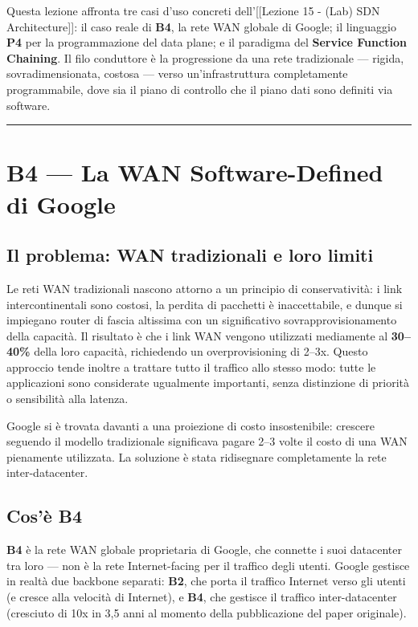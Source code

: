 \documentclass[
  italian,
  openany]{book}
\begin{document}
Questa lezione affronta tre casi d'uso concreti dell'{[}{[}Lezione 15 -
(Lab) SDN Architecture{]}{]}: il caso reale di \textbf{B4}, la rete WAN
globale di Google; il linguaggio \textbf{P4} per la programmazione del
data plane; e il paradigma del \textbf{Service Function Chaining}. Il
filo conduttore è la progressione da una rete tradizionale --- rigida,
sovradimensionata, costosa --- verso un'infrastruttura completamente
programmabile, dove sia il piano di controllo che il piano dati sono
definiti via software.

\begin{center}\rule{0.5\linewidth}{0.5pt}\end{center}

\section{B4 --- La WAN Software-Defined di
Google}\label{b4-la-wan-software-defined-di-google}

\subsection{Il problema: WAN tradizionali e loro
limiti}\label{il-problema-wan-tradizionali-e-loro-limiti}

Le reti WAN tradizionali nascono attorno a un principio di
conservatività: i link intercontinentali sono costosi, la perdita di
pacchetti è inaccettabile, e dunque si impiegano router di fascia
altissima con un significativo sovrapprovisionamento della capacità. Il
risultato è che i link WAN vengono utilizzati mediamente al
\textbf{30--40\%} della loro capacità, richiedendo un overprovisioning
di 2--3x. Questo approccio tende inoltre a trattare tutto il traffico
allo stesso modo: tutte le applicazioni sono considerate ugualmente
importanti, senza distinzione di priorità o sensibilità alla latenza.

Google si è trovata davanti a una proiezione di costo insostenibile:
crescere seguendo il modello tradizionale significava pagare 2--3 volte
il costo di una WAN pienamente utilizzata. La soluzione è stata
ridisegnare completamente la rete inter-datacenter.

\subsection{Cos'è B4}\label{cosuxe8-b4}

\textbf{B4} è la rete WAN globale proprietaria di Google, che connette i
suoi datacenter tra loro --- non è la rete Internet-facing per il
traffico degli utenti. Google gestisce in realtà due backbone separati:
\textbf{B2}, che porta il traffico Internet verso gli utenti (e cresce
alla velocità di Internet), e \textbf{B4}, che gestisce il traffico
inter-datacenter (cresciuto di 10x in 3,5 anni al momento della
pubblicazione del paper originale).
\end{document}
